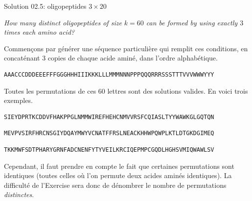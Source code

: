 \documentclass[ignorenonframetext,]{beamer}
\begin{document}
\begin{frame}[fragile]{Solution 02.5: oligopeptides \(3 \times 20\)}
\protect\hypertarget{solution-02.5-oligopeptides-3-times-20}{}

\emph{How many distinct oligopeptides of size \(k=60\) can be formed by
using exactly \(3\) times each amino acid?}

Commençons par générer une séquence particulière qui remplit ces
conditions, en concaténant 3 copies de chaque acide aminé, dans l'ordre
alphabétique.

\begin{verbatim}
AAACCCDDDEEEFFFGGGHHHIIIKKKLLLMMMNNNPPPQQQRRRSSSTTTVVVWWWYYY
\end{verbatim}

Toutes les permutations de ces 60 lettres sont des solutions valides. En
voici trois exemples.

\begin{verbatim}
SIEYDPRTKCDDVFHAKPPGLNMMWIREFHEHCNMVVRSFCQIASLTYYWAWKGLGQTQN
\end{verbatim}

\begin{verbatim}
MEVPVSIRFHRCNSGIYDQAYMWYVCNATFFRSLNEACKHHWPQWPLKTLDTGKDGIMEQ
\end{verbatim}

\begin{verbatim}
TKKMWFSDTPHARYGRNFADCNENFYTYVEILKRCIQEPMPCGQDLHGHSVMIQWAWLSV
\end{verbatim}

Cependant, il faut prendre en compte le fait que certaines permutations
sont identiques (toutes celles où l'on permute deux acides aminés
identiques). La difficulté de l'Exercise sera donc de dénombrer le
nombre de permutations \emph{distinctes}.

\end{frame}
\end{document}
